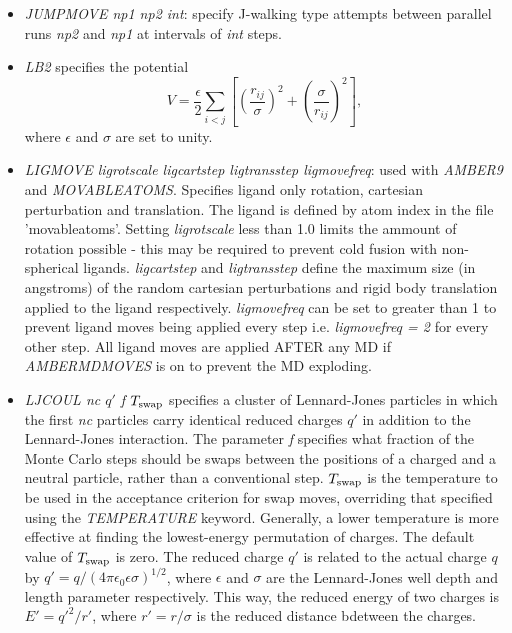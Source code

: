 \documentclass[12pt,a4paper,dvips]{article}
\begin{document}
\begin{itemize}
\item {\it JUMPMOVE np1 np2 int\/}: specify J-walking type attempts between parallel runs {\it np2\/}
and {\it np1\/} at intervals of {\it int\/} steps.

\item {\it LB2} specifies the potential\cite{LB299a,LB299b,LB204}
\begin{equation}
V = \frac{\epsilon}{2} \sum_{i<j} \left[ \left(\frac{r_{ij}}{\sigma}\right)^2+
\left(\frac{\sigma}{r_{ij}}\right)^2 \right],
\end{equation}
where $\epsilon$ and $\sigma$ are set to unity.

\item {\it LIGMOVE ligrotscale ligcartstep ligtransstep ligmovefreq\/}: used with {\it AMBER9\/} and {\it MOVABLEATOMS}. Specifies ligand only rotation, cartesian perturbation and translation. The ligand is defined by atom index in the file 'movableatoms'. Setting {\it ligrotscale} less than 1.0
limits the ammount of rotation possible - this may be required to prevent cold fusion with non-spherical ligands. {\it ligcartstep} and {\it ligtransstep} 
define the maximum size (in angstroms) of the random cartesian perturbations and rigid body translation applied to the ligand respectively. 
{\it ligmovefreq} can be set to greater than 1 to prevent ligand moves being applied every step i.e. {\it ligmovefreq = 2} for every other step.
All ligand moves are applied AFTER any MD if {\it AMBERMDMOVES} is on to prevent the MD exploding.    

\item {\it LJCOUL nc $q'$ f $T_{\rm swap}$} specifies a cluster of Lennard-Jones particles in which the first {\it nc}
particles carry identical reduced charges {\it $q'$} in addition to the Lennard-Jones interaction.
The parameter {\it f} specifies what fraction of the Monte Carlo steps should be swaps between the
positions of a charged and a neutral particle, rather than a conventional step.
$T_{\rm swap}$ is the temperature to be used in the acceptance criterion for swap moves, overriding
that specified using the {\it TEMPERATURE} keyword.  Generally, a lower temperature is more effective
at finding the lowest-energy permutation of charges.  The default value of $T_{\rm swap}$ is zero.
The reduced charge $q'$ is related to the actual charge $q$ by $q'=q/(4\pi\epsilon_0\epsilon\sigma)^{1/2}$,
where $\epsilon$ and $\sigma$ are the Lennard-Jones well depth and length parameter respectively.
This way, the reduced energy of two charges is $E'=q'^2/r'$, where $r'=r/\sigma$ is the reduced distance
bdetween the charges.


\end{itemize}
\end{document}
